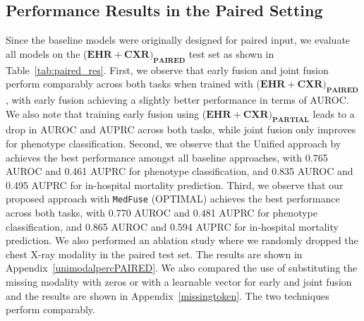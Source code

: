 \documentclass[pmlr]{jmlr}
\begin{document}
\vspace{-2mm}
\subsection{Performance Results in the Paired Setting}
Since the baseline models were originally designed for paired input, we evaluate all models on the ($\mathbf{EHR+CXR})_{\mathbf{PAIRED}}$ test set as shown in Table~\ref{tab:paired_res}. First, we observe that early fusion and joint fusion perform comparably across both tasks when trained with ($\mathbf{EHR+CXR})_{\mathbf{PAIRED}}$, with early fusion achieving a slightly better performance in terms of AUROC. We also note that training early fusion using ($\mathbf{EHR+CXR})_{\mathbf{PARTIAL}}$ leads to a drop in AUROC and AUPRC across both tasks, while joint fusion only improves for phenotype classification. Second, we observe that the Unified approach by \cite{hayat2021dynamic} achieves the best performance amongst all baseline approaches, with 0.765 AUROC and 0.461 AUPRC for phenotype classification, and 0.835 AUROC and 0.495 AUPRC for in-hospital mortality prediction. Third, we observe that our proposed approach with \texttt{MedFuse} (OPTIMAL) achieves the best performance across both tasks, with 0.770 AUROC and 0.481 AUPRC for phenotype classification, and 0.865 AUROC and 0.594 AUPRC for in-hospital mortality prediction. We also performed an ablation study where we randomly dropped the chest X-ray modality in the paired test set. The results are shown in Appendix~\ref{unimodalpercPAIRED}. We also compared the use of substituting the missing modality with zeros or with a learnable vector for early and joint fusion and the results are shown in Appendix~\ref{missingtoken}. The two techniques perform comparably. 
\end{document}
